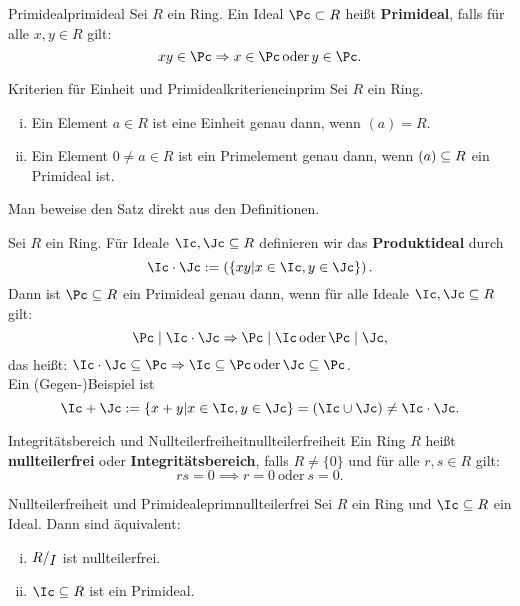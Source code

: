 \begin{definition}{Primideal}{primideal}
Sei $R$ ein Ring. Ein Ideal $\Pc \subset R$ heißt \textbf{Primideal}, falls für alle $x,y \in R$ gilt:
\begin{equation}
xy \in \Pc \implies x\in \Pc \, \text{oder} \, y \in \Pc.
\end{equation}
\end{definition}
\begin{satz}{Kriterien für Einheit und Primideal}{kriterieneinprim}
Sei $R$ ein Ring.
\begin{enumerate}[(i)]
\item Ein Element $a \in R$ ist eine Einheit genau dann, wenn $(a) =R$.
\item Ein Element $0 \neq a \in R$ ist ein Primelement genau dann, wenn $(a) \subseteq R$ ein Primideal ist.
\end{enumerate}
\end{satz}
\begin{übung}
Man beweise den Satz direkt aus den Definitionen.
\end{übung}
\begin{übung}
Sei $R$ ein Ring. Für Ideale $\Ic, \Jc \sub R$ definieren wir das \textbf{Produktideal} durch
\begin{equation}
\Ic \cdot \Jc := \left(\{xy| x \in \Ic, y \in \Jc\}\right).
\end{equation}
Dann ist $\Pc \sub R$ ein Primideal genau dann, wenn für alle Ideale $\Ic, \Jc \sub R$ gilt:
\begin{equation}
\Pc \mid \Ic \cdot \Jc \implies \Pc \mid \Ic \, \text{oder} \, \Pc \mid \Jc,
\end{equation}
das heißt: $\Ic \cdot \Jc \sub \Pc  \implies \Ic \sub \Pc \, \text{oder} \, \Jc \sub \Pc$.\\
Ein (Gegen-)Beispiel ist 
\begin{equation}
\Ic + \Jc := \{x+y| x \in \Ic, y \in \Jc\} = (\Ic \cup \Jc) \neq \Ic \cdot \Jc.
\end{equation}
\end{übung}
\begin{definition}{Integritätsbereich und Nullteilerfreiheit}{nullteilerfreiheit}
Ein Ring $R$ heißt \textbf{nullteilerfrei} oder \textbf{Integritätsbereich}, falls $R\neq \{0\}$ und für alle $r,s \in R$ gilt:
\begin{equation}
rs = 0 \implies r=0 \ \text{oder} \ s=0.
\end{equation}
\end{definition}
\begin{satz}{Nullteilerfreiheit und Primideale}{primnullteilerfrei}
Sei $R$ ein Ring und $\Ic \sub R$ ein Ideal. Dann sind äquivalent:
\begin{enumerate}[(i)]
\item $\quotient{R}{I}$ ist nullteilerfrei.
\item $\Ic \sub R$ ist ein Primideal.
\end{enumerate}
\end{satz}
